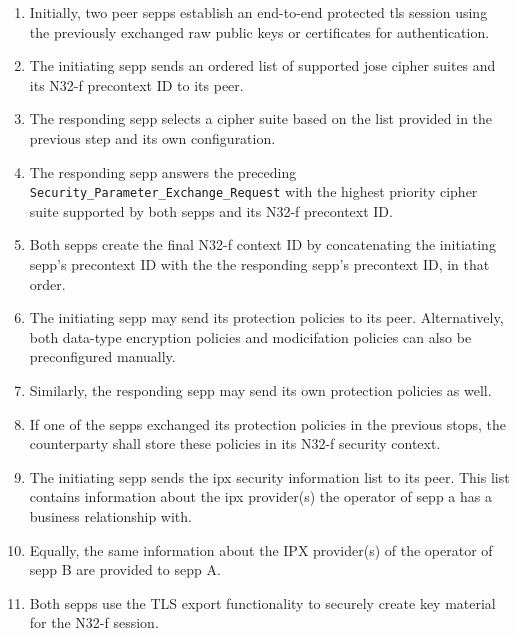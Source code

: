 \begin{enumerate}[wide, labelwidth=!, labelindent=0pt]
    \item Initially, two peer \glspl{sepp} establish an end-to-end protected \gls{tls} session using the previously exchanged raw public keys or certificates for authentication.
    \item The initiating \gls{sepp} sends an ordered list of supported \gls{jose} cipher suites and its N32-f precontext ID to its peer.
    \item The responding \gls{sepp} selects a cipher suite based on the list provided in the previous step and its own configuration.
    \item The responding \gls{sepp} answers the preceding \texttt{Security\_Parameter\_Exchange\_Request} with the highest priority cipher suite supported by both \glspl{sepp} and its N32-f precontext ID.
    \item Both \glspl{sepp} create the final N32-f context ID by concatenating the initiating \gls{sepp}'s precontext ID with the the responding \gls{sepp}'s precontext ID, in that order.
    \item The initiating \gls{sepp} may send its protection policies to its peer. Alternatively, both data-type encryption policies and modicifation policies can also be preconfigured manually.
    \item Similarly, the responding \gls{sepp} may send its own protection policies as well.
    \item If one of the \glspl{sepp} exchanged its protection policies in the previous stops, the counterparty shall store these policies in its N32-f security context.
    \item The initiating \gls{sepp} sends the \gls{ipx} security information list to its peer. This list contains information about the \gls{ipx} provider(s) the operator of \gls{sepp} a has a business relationship with.
    \item Equally, the same information about the IPX provider(s) of the operator of \gls{sepp} B are provided to \gls{sepp} A.
    \item Both \glspl{sepp} use the TLS export functionality to securely create key material for the N32-f session.

\end{enumerate}
